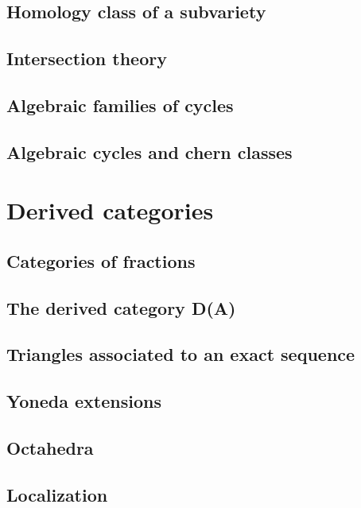 \documentclass[5pt]{article}
\theoremstyle{definition}
\theoremstyle{remark}
\begin{document}
	\subsection{Homology class of a subvariety}
	
	\subsection{Intersection theory}
	
	\subsection{Algebraic families of cycles}
	
	\subsection{Algebraic cycles and chern classes}
	
	\newpage
	
	\section{Derived categories}
	
	\subsection{Categories of fractions}
	
	\subsection{The derived category D(A)} 
	
	\subsection{Triangles associated to an exact sequence}
	
	\subsection{Yoneda extensions}
	
	\subsection{Octahedra}
	
	\subsection{Localization}
	
\end{document}
